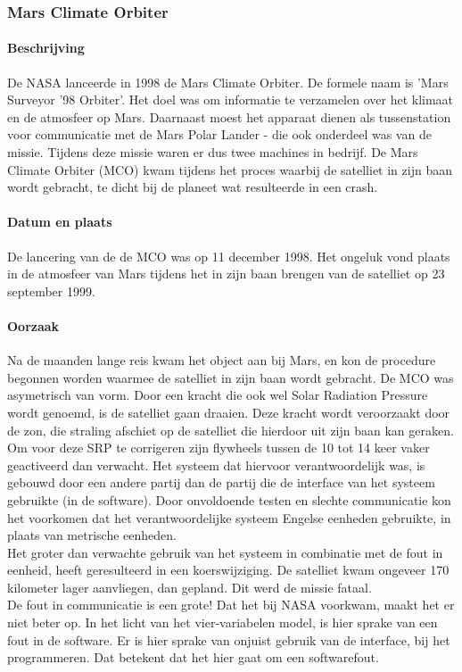 \documentclass{article}
\begin{document}
			\subsubsection{Mars Climate Orbiter}

				\paragraph{Beschrijving}

					De NASA lanceerde in 1998 de Mars Climate Orbiter. De formele naam is 'Mars Surveyor '98 Orbiter'. Het doel was om informatie te verzamelen over het klimaat en de atmosfeer op Mars. Daarnaast moest het apparaat dienen als tussenstation voor communicatie met de Mars Polar Lander - die ook onderdeel was van de missie. Tijdens deze missie waren er dus twee machines in bedrijf. De Mars Climate Orbiter (MCO) kwam tijdens het proces waarbij de satelliet in zijn baan wordt gebracht, te dicht bij de planeet wat resulteerde in een crash.

				\paragraph{Datum en plaats}

					De lancering van de de MCO was op 11 december 1998. Het ongeluk vond plaats in de atmosfeer van Mars tijdens het in zijn baan brengen van de satelliet op 23 september 1999.

				\paragraph{Oorzaak}

					Na de maanden lange reis kwam het object aan bij Mars, en kon de procedure begonnen worden waarmee de satelliet in zijn baan wordt gebracht. De MCO was asymetrisch van vorm. Door een kracht die ook wel Solar Radiation Pressure wordt genoemd, is de satelliet gaan draaien. Deze kracht wordt veroorzaakt door de zon, die straling afschiet op de satelliet die hierdoor uit zijn baan kan geraken. \cite{yousef2022balancing} Om voor deze SRP te corrigeren zijn flywheels tussen de 10 tot 14 keer vaker geactiveerd dan verwacht. Het systeem dat hiervoor verantwoordelijk was, is gebouwd door een andere partij dan de partij die de interface van het systeem gebruikte (in de software). Door onvoldoende testen en slechte communicatie kon het voorkomen dat het verantwoordelijke systeem Engelse eenheden gebruikte, in plaats van metrische eenheden. \\
					Het groter dan verwachte gebruik van het systeem in combinatie met de fout in eenheid, heeft geresulteerd in een koerswijziging. De satelliet kwam ongeveer 170 kilometer lager aanvliegen, dan gepland. Dit werd de missie fataal. \cite{stephenson1999mars} \\
					De fout in communicatie is een grote! Dat het bij NASA voorkwam, maakt het er niet beter op. In het licht van het vier-variabelen model, is hier sprake van een fout in de software. Er is hier sprake van onjuist gebruik van de interface, bij het programmeren. Dat betekent dat het hier gaat om een softwarefout.
		
\end{document}
